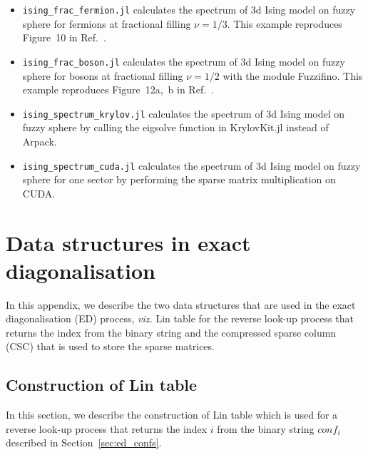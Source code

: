 \documentclass{timesjhep}
\begin{document}
\begin{itemize}
    \item \lstinline|ising_frac_fermion.jl| calculates the spectrum of 3d Ising model on fuzzy sphere for fermions at fractional filling $\nu = 1/3$. This example reproduces Figure~10 in Ref.~\cite{Voinea2024}.
    \item \lstinline|ising_frac_boson.jl| calculates the spectrum of 3d Ising model on fuzzy sphere for bosons at fractional filling $\nu = 1/2$ with the module Fuzzifino. This example reproduces Figure~12a,~b in Ref.~\cite{Voinea2024}.
    \item \lstinline|ising_spectrum_krylov.jl| calculates the spectrum of 3d Ising model on fuzzy sphere by calling the eigsolve function in KrylovKit.jl instead of Arpack.
    \item \lstinline|ising_spectrum_cuda.jl| calculates the spectrum of 3d Ising model on fuzzy sphere for one sector by performing the sparse matrix multiplication on CUDA.
\end{itemize}



\clearpage
\appendix

\section{Data structures in exact diagonalisation}

In this appendix, we describe the two data structures that are used in the exact diagonalisation (ED) process, \textit{viz.} Lin table for the reverse look-up process that returns the index from the binary string and the compressed sparse column (CSC) that is used to store the sparse matrices. 

\subsection{Construction of Lin table}
\label{app:data_lin}

In this section, we describe the construction of Lin table which is used for a reverse look-up process that returns the index $i$ from the binary string $conf_i$ described in Section~\ref{sec:ed_confs}. 
\end{document}
